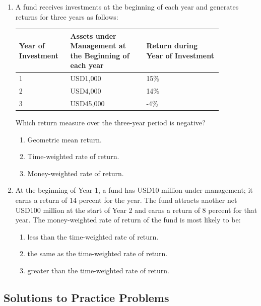 \begin{enumerate}
	\item A fund receives investments at the beginning of each year and generates returns for three years as follows:
	      \begin{center}
	      \begin{tabular}{p{0.18\linewidth} | p{0.33\linewidth} | p{0.33\linewidth}}
		      \toprule
		      \textbf{Year of Investment} & \textbf{Assets under Management at the Beginning of each year} & \textbf{Return during Year of Investment} \\
		      \midrule
		      1 & USD1,000 & 15\% \\
		      2 & USD4,000 & 14\% \\
		      3 & USD45,000 & -4\% \\
		      \bottomrule
	      \end{tabular}
	      \end{center}
	      Which return measure over the three-year period is negative?
	      \begin{enumerate}[label=\Alph*.]
		      \item Geometric mean return.
		      \item Time-weighted rate of return.
		      \item Money-weighted rate of return.
	      \end{enumerate}

	\item At the beginning of Year 1, a fund has USD10 million under management; it earns a return of 14 percent for the year. The fund attracts another net USD100 million at the start of Year 2 and earns a return of 8 percent for that year. The money-weighted rate of return of the fund is most likely to be:
	      \begin{enumerate}[label=\Alph*.]
		      \item less than the time-weighted rate of return.
		      \item the same as the time-weighted rate of return.
		      \item greater than the time-weighted rate of return.
	      \end{enumerate}
\end{enumerate}

\subsection{Solutions to Practice Problems}
\label{subsec:app_Solutions_M3}

